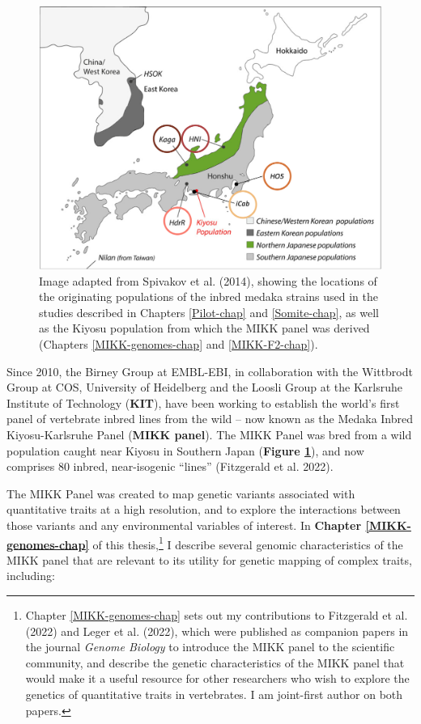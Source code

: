 \documentclass[
]{book}
\begin{document}
\begin{figure}

{\centering \includegraphics[width=1\linewidth]{figs/pilot/line_locations} 

}

\caption{Image adapted from Spivakov et al. (2014), showing the locations of the originating populations of the inbred medaka strains used in the studies described in Chapters \ref{Pilot-chap} and \ref{Somite-chap}, as well as the Kiyosu population from which the MIKK panel was derived (Chapters \ref{MIKK-genomes-chap} and \ref{MIKK-F2-chap}).}\label{fig:line-locations}
\end{figure}

Since 2010, the Birney Group at EMBL-EBI, in collaboration with the Wittbrodt Group at COS, University of Heidelberg and the Loosli Group at the Karlsruhe Institute of Technology (\textbf{KIT}), have been working to establish the world's first panel of vertebrate inbred lines from the wild -- now known as the Medaka Inbred Kiyosu-Karlsruhe Panel (\textbf{MIKK panel}). The MIKK Panel was bred from a wild population caught near Kiyosu in Southern Japan (\textbf{Figure \ref{fig:line-locations}}), and now comprises 80 inbred, near-isogenic ``lines'' (Fitzgerald et al. 2022).

The MIKK Panel was created to map genetic variants associated with quantitative traits at a high resolution, and to explore the interactions between those variants and any environmental variables of interest. In \textbf{Chapter \ref{MIKK-genomes-chap}} of this thesis,\footnote{Chapter \ref{MIKK-genomes-chap} sets out my contributions to Fitzgerald et al. (2022) and Leger et al. (2022), which were published as companion papers in the journal \emph{Genome Biology} to introduce the MIKK panel to the scientific community, and describe the genetic characteristics of the MIKK panel that would make it a useful resource for other researchers who wish to explore the genetics of quantitative traits in vertebrates. I am joint-first author on both papers.} I describe several genomic characteristics of the MIKK panel that are relevant to its utility for genetic mapping of complex traits, including:
\end{document}
